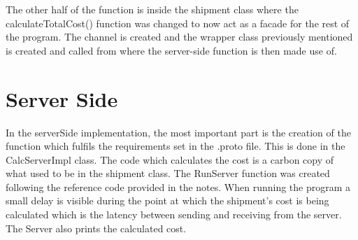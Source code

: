 \documentclass[12pt, a4paper]{report}
\begin{document}
The other half of the function is inside the shipment class where the calculateTotalCost() function was changed to now act as a facade for the rest of the program. The channel is created and the wrapper class previously mentioned is created and called from where the server-side function is then made use of.

\section{Server Side}
In the serverSide implementation, the most important part is the creation of the function which fulfils the requirements set in the .proto file. This is done in the CalcServerImpl class. The code which calculates the cost is a carbon copy of what used to be in the shipment class. The RunServer function was created following the reference code provided in the notes. When running the program a small delay is visible during the point at which the shipment's cost is being calculated which is the latency between sending and receiving from the server. The Server also prints the calculated cost.
\end{document}
